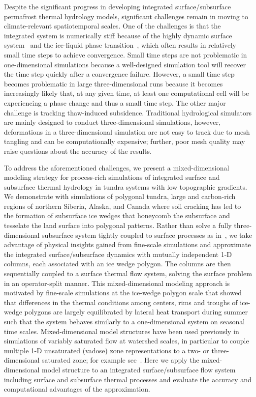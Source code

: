 \documentclass[review]{elsarticle}
\begin{document}
Despite the significant progress in developing integrated surface/subsurface permafrost thermal hydrology models, significant challenges remain in moving to climate-relevant spatiotemporal scales. One of the challenges is that the integrated system is numerically stiff because of the highly dynamic surface system~\cite{spainter2016integrated} and the ice-liquid phase transition~\cite{dall2011robust}, which often results in relatively small time steps to achieve convergence. Small time steps are not problematic in one-dimensional simulations because a well-designed simulation tool will recover the time step quickly after a convergence failure. However, a small time step becomes problematic in large three-dimensional runs because it becomes increasingly likely that, at any given time, at least one computational cell will be experiencing a phase change and thus a small time step. The other major challenge is tracking thaw-induced subsidence. Traditional hydrological simulators are mainly designed to conduct three-dimensional simulations, however, deformations in a three-dimensional simulation are not easy to track due to mesh tangling and can be computationally expensive; further, poor mesh quality may raise questions about the accuracy of the results. 

To address the aforementioned challenges, we present a mixed-dimensional modeling strategy for process-rich simulations of integrated surface and subsurface thermal hydrology in tundra systems with low topographic gradients. We demonstrate with simulations of polygonal tundra, large and carbon-rich regions of northern Siberia, Alaska, and Canada where soil cracking has led to the formation of subsurface ice wedges that honeycomb the subsurface and tesselate the land surface into polygonal patterns. Rather than solve a fully three-dimensional subsurface system tightly coupled to surface processes as in~\cite{spainter2016integrated}, we take advantage of physical insights gained from fine-scale simulations and approximate the integrated surface/subsurface dynamics with mutually independent 1-D columns, each associated with an ice wedge polygon. The columns are then sequentially coupled to a surface thermal flow system, solving the surface problem in an operator-split manner. This mixed-dimensional modeling approach is motivated by fine-scale simulations at the ice-wedge polygon scale that showed that differences in the thermal conditions among centers, rims and troughs of ice-wedge polygons are largely equilibrated by lateral heat transport during summer such that the system behaves similarly to a one-dimensional system on seasonal time scales. Mixed-dimensional model structures have been used previously in simulations of variably saturated flow at watershed scales, in particular to couple multiple 1-D unsaturated (vadose) zone representations to a two- or three-dimensional saturated zone; for example see~\cite{pikul1974numerical,zhu2011method,hybrid3D}. Here we apply the mixed-dimensional model structure to an integrated surface/subsurface flow system including surface and subsurface thermal processes and evaluate the accuracy and computational advantages of the approximation. 
\end{document}
